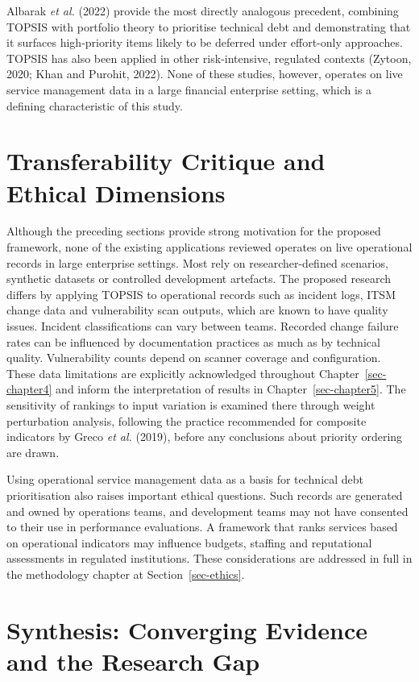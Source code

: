 \documentclass[
  12pt,
  letterpaper,
  12pt,
  oneside,
  english,
  onehalfspacing,
  headsepline]{MastersDoctoralThesis}
\begin{document}
Albarak \emph{et al.} (2022) provide the most directly analogous
precedent, combining TOPSIS with portfolio theory to prioritise
technical debt and demonstrating that it surfaces high-priority items
likely to be deferred under effort-only approaches. TOPSIS has also been
applied in other risk-intensive, regulated contexts (Zytoon, 2020; Khan
and Purohit, 2022). None of these studies, however, operates on live
service management data in a large financial enterprise setting, which
is a defining characteristic of this study.

\section{Transferability Critique and Ethical
Dimensions}\label{sec-transfer}

Although the preceding sections provide strong motivation for the
proposed framework, none of the existing applications reviewed operates
on live operational records in large enterprise settings. Most rely on
researcher-defined scenarios, synthetic datasets or controlled
development artefacts. The proposed research differs by applying TOPSIS
to operational records such as incident logs, ITSM change data and
vulnerability scan outputs, which are known to have quality issues.
Incident classifications can vary between teams. Recorded change failure
rates can be influenced by documentation practices as much as by
technical quality. Vulnerability counts depend on scanner coverage and
configuration. These data limitations are explicitly acknowledged
throughout Chapter~\ref{sec-chapter4} and inform the interpretation of
results in Chapter~\ref{sec-chapter5}. The sensitivity of rankings to
input variation is examined there through weight perturbation analysis,
following the practice recommended for composite indicators by Greco
\emph{et al.} (2019), before any conclusions about priority ordering are
drawn.

Using operational service management data as a basis for technical debt
prioritisation also raises important ethical questions. Such records are
generated and owned by operations teams, and development teams may not
have consented to their use in performance evaluations. A framework that
ranks services based on operational indicators may influence budgets,
staffing and reputational assessments in regulated institutions. These
considerations are addressed in full in the methodology chapter at
Section~\ref{sec-ethics}.

\section{Synthesis: Converging Evidence and the Research
Gap}\label{synthesis-converging-evidence-and-the-research-gap}
\end{document}
